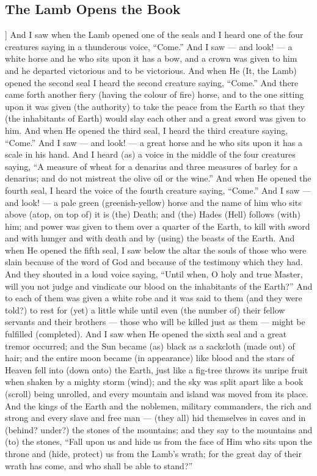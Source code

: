 \begin{pages}
\begin{Leftside}
        			\chapter{The Lamb Opens the Book}
				]
		And I saw when the Lamb opened one of the seals and I heard one of the four creatures saying in a thunderous voice, “Come.” And I saw — and look! — a white horse and he who sits upon it has a bow, and a crown was given to him and he departed victorious and to be victorious.
		\pend
		\pstart
		And when He (It, the Lamb) opened the second seal I heard the second creature saying, “Come.” And there came forth another fiery (having the colour of fire) horse, and to the one sitting upon it was given (the authority) to take the peace from the Earth so that they (the inhabitants of Earth) would slay each other and a great sword was given to him.
		\pend
		\pstart
		And when He opened the third seal, I heard the third creature saying, “Come.” And I saw — and look! — a great horse and he who sits upon it has a scale in his hand. And I heard (as) a voice in the middle of the four creatures saying, “A measure of wheat for a denarius and three measures of barley for a denarius; and do not mistreat the olive oil or the wine.”
		\pend
		\pstart
		And when He opened the fourth seal, I heard the voice of the fourth creature saying, “Come.” And I saw — and look! — a pale green (greenish-yellow) horse and the name of him who sits above (atop, on top of) it is (the) Death; and (the) Hades (Hell) follows (with) him; and power was given to them over a quarter of the Earth, to kill with sword and with hunger and with death and by (using) the beasts of the Earth.
		\pend
		\pstart
		And when He opened the fifth seal, I saw below the altar the souls of those who were slain because of the word of God and because of the testimony which they had. And they shouted in a loud voice saying, “Until when, O holy and true Master, will you not judge and vindicate our blood on the inhabitants of the Earth?” And to each of them was given a white robe and it was said to them (and they were told?) to rest for (yet) a little while until even (the number of) their fellow servants and their brothers — those who will be killed just as them — might be fulfilled (completed).
		\pend
		\pstart
		And I saw when He opened the sixth seal and a great tremor occurred; and the Sun became (as) black as a sackcloth (made out) of hair; and the entire moon became (in appearance) like blood and the stars of Heaven fell into (down onto) the Earth, just like a fig-tree throws its unripe fruit when shaken by a mighty storm (wind); and the sky was split apart like a book (scroll) being unrolled, and every mountain and island was moved from its place.
		\pend
		\pstart
		And the kings of the Earth and the noblemen, military commanders, the rich and strong and every slave and free man — (they all) hid themselves in caves and in (behind? under?) the stones of the mountains; and they say to the mountains and (to) the stones, “Fall upon us and hide us from the face of Him who sits upon the throne and (hide, protect) us from the Lamb’s wrath; for the great day of their wrath has come, and who shall be able to stand?”
		\pend
        \endnumbering
    \end{Leftside}

\end{pages} 
\Pages